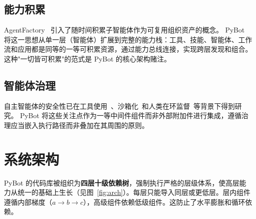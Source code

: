 \documentclass[11pt,a4paper]{article}
\begin{document}
\subsection{能力积累}

AgentFactory~\cite{agentfactory2024} 引入了随时间积累子智能体作为可复用组织资产的概念。
PyBot 将这一思想从单一层（智能体）扩展到完整的能力栈：工具、技能、智能体、工作流和应用都是同等的一等可积累资源，通过能力总线连接，实现跨层发现和组合。
这种"一切皆可积累"的范式是 PyBot 的核心架构赌注。

\subsection{智能体治理}

自主智能体的安全性已在工具使用~\cite{toolformer2023}、沙箱化~\cite{e2b2024}和人类在环监督~\cite{hitl2023}等背景下得到研究。
PyBot 将这些关注点作为一等中间件组件而非外部附加件进行集成，遵循治理应当嵌入执行路径而非叠加在其周围的原则。


\section{系统架构}
\label{sec:arch}

PyBot 的代码库被组织为\textbf{四层十级依赖树}，强制执行严格的层级体系，使高层能力从统一的基础上生长（见图~\ref{fig:arch}）。每层只能导入同层或更低层。层内组件遵循内部梯度（$a \rightarrow b \rightarrow c$），高级组件依赖低级组件。这防止了水平膨胀和循环依赖。
\end{document}

